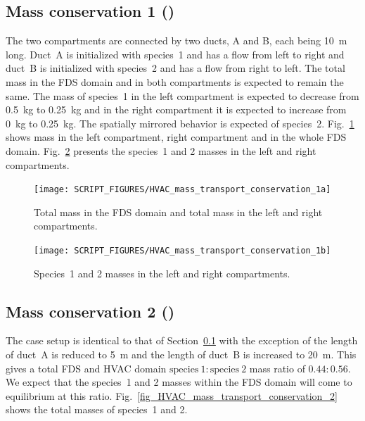 \documentclass[11pt]{book}
\begin{document}
\subsection{Mass conservation 1 (\texorpdfstring{}{HVAC\_mass\_transport\_conservation\_1})}
\label{HVAC_mass_transport_conservation_1}
The two compartments are connected by two ducts, A and B, each being \SI{10}{\meter} long. Duct~A is initialized with species~1 and has a flow from left to right and duct~B is initialized with species~2 and has a flow from right to left. The total mass in the FDS domain and in both compartments is expected to remain the same. The mass of species~1 in the left compartment is expected to decrease from \SI{0.5}{\kilogram} to \SI{0.25}{\kilogram} and in the right compartment it is expected to increase from \SI{0}{\kilogram} to \SI{0.25}{\kilogram}. The spatially mirrored behavior is expected of species~2. Fig.~\ref{fig_HVAC_mass_transport_conservation_1a} shows mass in the left compartment, right compartment and in the whole FDS domain. Fig.~\ref{fig_HVAC_mass_transport_conservation_1b} presents the species~1 and 2 masses in the left and right compartments.

\begin{figure}[ht]
\centering
\texttt{[image: SCRIPT\_FIGURES/HVAC\_mass\_transport\_conservation\_1a]}
\caption[ test case.]{Total mass in the FDS domain and total mass in the left and right compartments.}
\label{fig_HVAC_mass_transport_conservation_1a}
\end{figure}

\begin{figure}[ht]
\centering
\texttt{[image: SCRIPT\_FIGURES/HVAC\_mass\_transport\_conservation\_1b]}
\caption[ test case.]{Species~1 and 2 masses in the left and right compartments.}
\label{fig_HVAC_mass_transport_conservation_1b}
\end{figure}

\subsection{Mass conservation 2 (\texorpdfstring{}{HVAC\_mass\_transport\_conservation\_2})}
\label{HVAC_mass_transport_conservation_2}
The case setup is identical to that of Section~\ref{HVAC_mass_transport_conservation_1} with the exception of the length of duct~A is reduced to \SI{5}{\meter} and the length of duct~B is increased to \SI{20}{\meter}. This gives a total FDS and HVAC domain \(\text{species}\ 1 \colon \text{species}\ 2\) mass ratio of \(0.44 \colon 0.56\). We expect that the species~1 and 2 masses within the FDS domain will come to equilibrium at this ratio. Fig.~\ref{fig_HVAC_mass_transport_conservation_2} shows the total masses of species~1 and 2.
\end{document}
